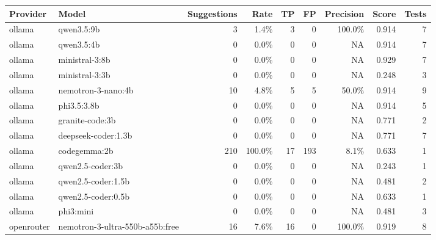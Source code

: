 \begin{tabular}{@{}llrrrrrrr@{}}
\toprule
Provider & Model & Suggestions & Rate & TP & FP & Precision & Score & Tests \\
\midrule
ollama & qwen3.5:9b & 3 & 1.4\% & 3 & 0 & 100.0\% & 0.914 & 7 \\
ollama & qwen3.5:4b & 0 & 0.0\% & 0 & 0 & NA & 0.914 & 7 \\
ollama & ministral-3:8b & 0 & 0.0\% & 0 & 0 & NA & 0.929 & 7 \\
ollama & ministral-3:3b & 0 & 0.0\% & 0 & 0 & NA & 0.248 & 3 \\
ollama & nemotron-3-nano:4b & 10 & 4.8\% & 5 & 5 & 50.0\% & 0.914 & 9 \\
ollama & phi3.5:3.8b & 0 & 0.0\% & 0 & 0 & NA & 0.914 & 5 \\
ollama & granite-code:3b & 0 & 0.0\% & 0 & 0 & NA & 0.771 & 2 \\
ollama & deepseek-coder:1.3b & 0 & 0.0\% & 0 & 0 & NA & 0.771 & 7 \\
ollama & codegemma:2b & 210 & 100.0\% & 17 & 193 & 8.1\% & 0.633 & 1 \\
ollama & qwen2.5-coder:3b & 0 & 0.0\% & 0 & 0 & NA & 0.243 & 1 \\
ollama & qwen2.5-coder:1.5b & 0 & 0.0\% & 0 & 0 & NA & 0.481 & 2 \\
ollama & qwen2.5-coder:0.5b & 0 & 0.0\% & 0 & 0 & NA & 0.633 & 1 \\
ollama & phi3:mini & 0 & 0.0\% & 0 & 0 & NA & 0.481 & 3 \\
openrouter & nemotron-3-ultra-550b-a55b:free & 16 & 7.6\% & 16 & 0 & 100.0\% & 0.919 & 8 \\
\bottomrule
\end{tabular}